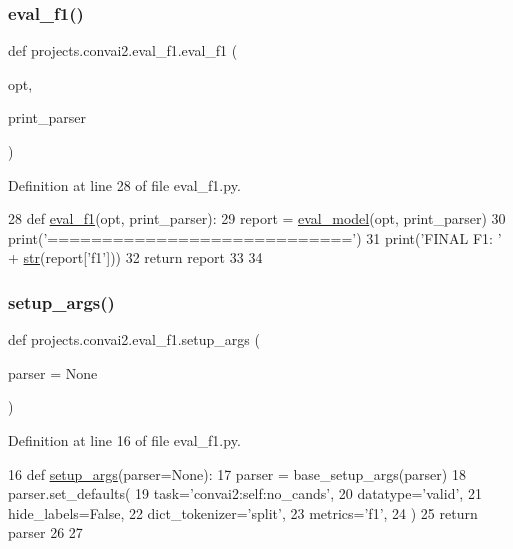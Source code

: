 \subsubsection{\texorpdfstring{eval\+\_\+f1()}{eval\_f1()}}
{\footnotesize\ttfamily def projects.\+convai2.\+eval\+\_\+f1.\+eval\+\_\+f1 (\begin{DoxyParamCaption}\item[{}]{opt,  }\item[{}]{print\+\_\+parser }\end{DoxyParamCaption})}



Definition at line 28 of file eval\+\_\+f1.\+py.


\begin{DoxyCode}
28 \textcolor{keyword}{def }\hyperlink{namespaceprojects_1_1convai2_1_1eval__f1_aac16a2ead8ff2b896c82411fe262f449}{eval\_f1}(opt, print\_parser):
29     report = \hyperlink{namespaceeval__model}{eval\_model}(opt, print\_parser)
30     print(\textcolor{stringliteral}{'============================'})
31     print(\textcolor{stringliteral}{'FINAL F1: '} + \hyperlink{namespacegenerate__task__READMEs_a5b88452ffb87b78c8c85ececebafc09f}{str}(report[\textcolor{stringliteral}{'f1'}]))
32     \textcolor{keywordflow}{return} report
33 
34 
\end{DoxyCode}
\mbox{\label{namespaceprojects_1_1convai2_1_1eval__f1_a74826f78ce1ce6c9fe9b6d4a6297f3bd}} 
\subsubsection{\texorpdfstring{setup\+\_\+args()}{setup\_args()}}
{\footnotesize\ttfamily def projects.\+convai2.\+eval\+\_\+f1.\+setup\+\_\+args (\begin{DoxyParamCaption}\item[{}]{parser = {\ttfamily None} }\end{DoxyParamCaption})}



Definition at line 16 of file eval\+\_\+f1.\+py.


\begin{DoxyCode}
16 \textcolor{keyword}{def }\hyperlink{namespaceprojects_1_1convai2_1_1eval__f1_a74826f78ce1ce6c9fe9b6d4a6297f3bd}{setup\_args}(parser=None):
17     parser = base\_setup\_args(parser)
18     parser.set\_defaults(
19         task=\textcolor{stringliteral}{'convai2:self:no\_cands'},
20         datatype=\textcolor{stringliteral}{'valid'},
21         hide\_labels=\textcolor{keyword}{False},
22         dict\_tokenizer=\textcolor{stringliteral}{'split'},
23         metrics=\textcolor{stringliteral}{'f1'},
24     )
25     \textcolor{keywordflow}{return} parser
26 
27 
\end{DoxyCode}


